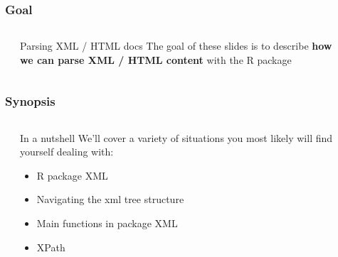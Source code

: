 \documentclass{beamer}\usepackage[]{graphicx}\usepackage[]{color}
\begin{document}
\begin{frame}
\frametitle{Goal}

\begin{columns}[t]
\begin{column}{0.1\textwidth}
\end{column}
\begin{column}{0.8\textwidth}

\begin{block}{Parsing XML / HTML docs}
The goal of these slides is to describe \textbf{how we can parse XML / HTML content} with the R package 
\end{block}

\end{column}
\begin{column}{0.1\textwidth}
\end{column}
\end{columns}

\end{frame}


\begin{frame}
\frametitle{Synopsis}

\begin{columns}[t]
\begin{column}{0.1\textwidth}
\end{column}
\begin{column}{0.8\textwidth}

\begin{block}{In a nutshell}
We'll cover a variety of situations you most likely will find yourself dealing with:
\begin{itemize}
 \item R package XML
 \item Navigating the xml tree structure
 \item Main functions in package XML
 \item XPath
\end{itemize}
\end{block}

\end{column}
\begin{column}{0.1\textwidth}
\end{column}
\end{columns}

\end{frame}
\end{document}
